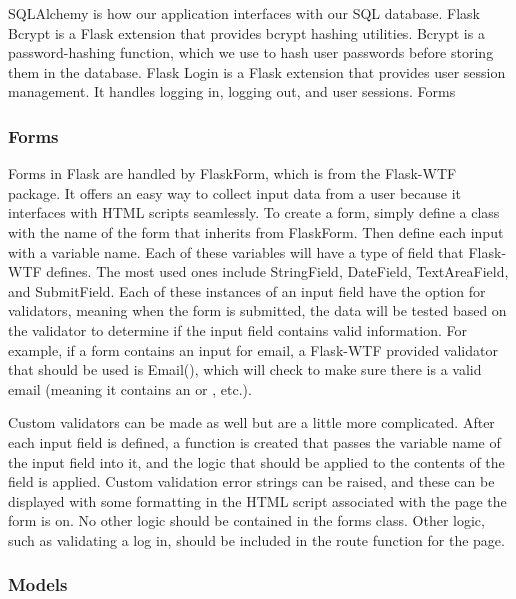 \documentclass[]{book}
\begin{document}
SQLAlchemy is how our application interfaces with our SQL database.
Flask Bcrypt is a Flask extension that provides bcrypt hashing utilities. Bcrypt is a password-hashing function, which we use to hash user passwords before storing them in the database.
Flask Login is a Flask extension that provides user session management. It handles logging in, logging out, and user sessions.
Forms

\hypertarget{forms}{%
\subsubsection{Forms}\label{forms}}

Forms in Flask are handled by FlaskForm, which is from the Flask-WTF package. It offers an easy way to collect input data from a user because it interfaces with HTML scripts seamlessly. To create a form, simply define a class with the name of the form that inherits from FlaskForm. Then define each input with a variable name. Each of these variables will have a type of field that Flask-WTF defines. The most used ones include StringField, DateField, TextAreaField, and SubmitField. Each of these instances of an input field have the option for validators, meaning when the form is submitted, the data will be tested based on the validator to determine if the input field contains valid information. For example, if a form contains an input for email, a Flask-WTF provided validator that should be used is Email(), which will check to make sure there is a valid email (meaning it contains an \citet{website.com} or \citet{website.org}, etc.).

Custom validators can be made as well but are a little more complicated. After each input field is defined, a function is created that passes the variable name of the input field into it, and the logic that should be applied to the contents of the field is applied. Custom validation error strings can be raised, and these can be displayed with some formatting in the HTML script associated with the page the form is on. No other logic should be contained in the forms class. Other logic, such as validating a log in, should be included in the route function for the page.

\hypertarget{models}{%
\subsubsection{Models}\label{models}}
\end{document}
